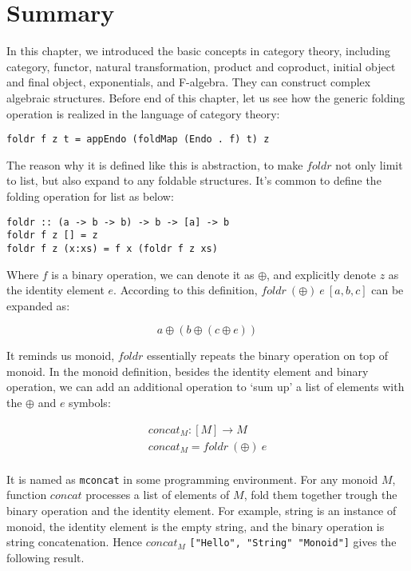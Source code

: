 \documentclass{article}
\begin{document}
\section{Summary}

In this chapter, we introduced the basic concepts in category theory, including category, functor, natural transformation, product and coproduct, initial object and final object, exponentials, and F-algebra. They can construct complex algebraic structures. Before end of this chapter, let us see how the generic folding operation is realized in the language of category theory\cite{Haskell-foldable}:

\lstset{frame=single}
\begin{lstlisting}
foldr f z t = appEndo (foldMap (Endo . f) t) z
\end{lstlisting}

The reason why it is defined like this is abstraction, to make $foldr$ not only limit to list, but also expand to any foldable structures. It's common to define the folding operation for list as below:

\begin{lstlisting}
foldr :: (a -> b -> b) -> b -> [a] -> b
foldr f z [] = z
foldr f z (x:xs) = f x (foldr f z xs)
\end{lstlisting}

Where $f$ is a binary operation, we can denote it as $\oplus$, and explicitly denote $z$ as the identity element $e$. According to this definition, $foldr\ (\oplus)\ e\ [a, b, c]$ can be expanded as:

\[
a \oplus (b \oplus (c \oplus e))
\]

It reminds us monoid, $foldr$ essentially repeats the binary operation on top of monoid. In the monoid definition, besides the identity element and binary operation, we can add an additional operation to `sum up' a list of elements with the $\oplus$ and $e$ symbols:

\[
\begin{array}{l}
concat_M : [M] \to M \\
concat_M = foldr\ (\oplus)\ e \\
\end{array}
\]

It is named as \texttt{mconcat} in some programming environment. For any monoid $M$, function $concat$ processes a list of elements of $M$, fold them together trough the binary operation and the identity element. For example, string is an instance of monoid, the identity element is the empty string, and the binary operation is string concatenation. Hence $concat_M$ \texttt{["Hello", "String" "Monoid"]} gives the following result.
\end{document}
